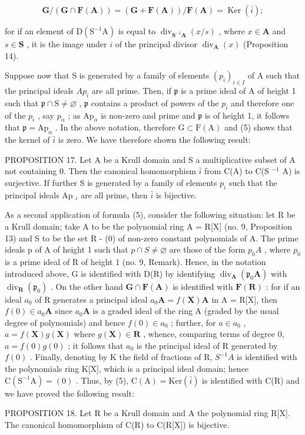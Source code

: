 \[
\mathbf {G} / (\mathbf {G} \cap \mathbf {F} (\mathbf {A})) = (\mathbf {G} + \mathbf {F} (\mathbf {A})) / \mathbf {F} (\mathbf {A}) = \operatorname{Ker} (\bar {i});\tag{5}
\]

for if an element of \(\mathrm{D}(\mathrm{S}^{-1}\mathrm{A})\) is equal to \(\operatorname{div}_{\mathbf{S}^{-1}\mathbf{A}}(x / s)\) , where \(x \in \mathbf{A}\) and \(s \in \mathbf{S}\) , it is the image under \(i\) of the principal divisor \(\operatorname{div}_{\mathbf{A}}(x)\) (Proposition 14).

Suppose now that S is generated by a family of elements \((p_{i})_{i\in I}\) of A such that the principal ideals \(Ap_{i}\) are all prime. Then, if \(\mathfrak{p}\) is a prime ideal of A of height 1 such that \(\mathfrak{p} \cap \mathrm{S} \neq \varnothing\) , \(\mathfrak{p}\) contains a product of powers of the \(p_{i}\) and therefore one of the \(p_{i}\) , say \(p_{\alpha}\) ; as \(\mathrm{Ap}_{\alpha}\) is non-zero and prime and \(\mathfrak{p}\) is of height 1, it follows that \(\mathfrak{p} = \mathrm{Ap}_{\alpha}\) . In the above notation, therefore \(\mathrm{G} \subset \mathrm{F}(\mathrm{A})\) and (5) shows that the kernel of \(\bar{i}\) is zero. We have therefore shown the following result:

PROPOSITION 17. Let A be a Krull domain and S a multiplicative subset of A not containing 0. Then the canonical homomorphism \(\bar{i}\) from C(A) to C(S \(^{-1}\) A) is surjective. If further S is generated by a family of elements \(p_{i}\) such that the principal ideals Ap \(_{i}\) are all prime, then \(\bar{i}\) is bijective.

As a second application of formula (5), consider the following situation: let R be a Krull domain; take A to be the polynomial ring A = R{[}X{]} (no. 9, Proposition 13) and S to be the set R - (0) of non-zero constant polynomials of A. The prime ideals p of A of height 1 such that \(p \cap S \neq \varnothing\) are those of the form \(p_{0}A\) , where \(p_{0}\) is a prime ideal of R of height 1 (no. 9, Remark). Hence, in the notation introduced above, G is identified with D(R) by identifying \(\operatorname{div}_{\mathbf{A}}(\mathfrak{p}_{0}\mathbf{A})\) with \(\operatorname{div}_{\mathbf{R}}(\mathfrak{p}_{0})\) . On the other hand \(\mathbf{G} \cap \mathbf{F}(\mathbf{A})\) is identified with \(\mathbf{F}(\mathbf{R})\) : for if an ideal \(a_{0}\) of R generates a principal ideal \(a_{0}\mathbf{A} = f(\mathbf{X})\mathbf{A}\) in A = R{[}X{]}, then \(f(0) \in a_{0}\mathbf{A}\) since \(a_{0}\mathbf{A}\) is a graded ideal of the ring A (graded by the usual degree of polynomials) and hence \(f(0) \in a_{0}\) ; further, for \(a \in a_{0}\) , \(a = f(\mathbf{X})g(\mathbf{X})\) where \(g(\mathbf{X}) \in \mathbf{R}\) , whence, comparing terms of degree 0, \(a = f(0)g(0)\) ; it follows that \(a_{0}\) is the principal ideal of R generated by \(f(0)\) . Finally, denoting by K the field of fractions of R, \(S^{-1}A\) is identified with the polynomials ring K{[}X{]}, which is a principal ideal domain; hence \(\mathrm{C}(\mathrm{S}^{-1}\mathrm{A}) = (0)\) . Thus, by (5), \(\mathrm{C}(\mathrm{A}) = \mathrm{Ker}(\bar{i})\) is identified with C(R) and we have proved the following result:

PROPOSITION 18. Let R be a Krull domain and A the polynomial ring R{[}X{]}. The canonical homomorphism of C(R) to C(R{[}X{]}) is bijective.

